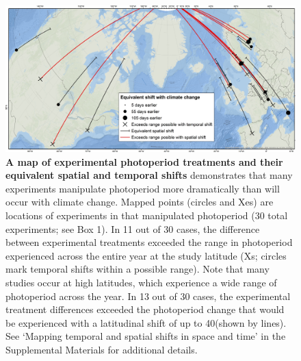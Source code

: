 \documentclass{article}
\begin{document}
\begin{figure}[h]
\centering
\includegraphics{..//..//analyses/photoperiod/figures/ospree_photopmap_fromblake.jpg} 
\caption{\textbf{A map of experimental photoperiod treatments and their equivalent spatial and temporal shifts} demonstrates that many experiments manipulate photoperiod more dramatically than will occur with climate change. Mapped points (circles and Xes) are locations of experiments in \citep{wolkovich2019} that manipulated photoperiod (30 total experiments; see Box 1). In 11 out of 30 cases, the difference between experimental treatments exceeded the range in photoperiod experienced across the entire year at the study latitude (Xs; circles mark temporal shifts within a possible range). Note that many studies occur at high latitudes, which experience a wide range of photoperiod across the year. In 13 out of 30 cases, the experimental treatment differences exceeded the photoperiod change that would be experienced with a latitudinal shift of up to 40\degree (shown by lines). See `Mapping temporal and spatial shifts in space and time' in the Supplemental Materials for additional details. }
 \label{fig:photomap}
 \end{figure}
\end{document}
